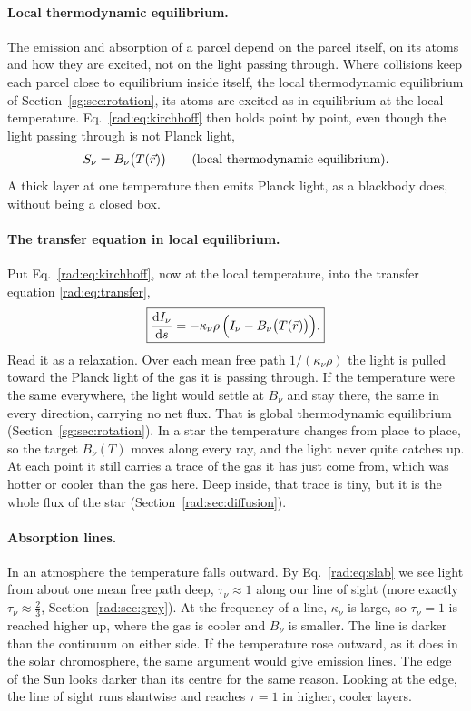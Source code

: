 \paragraph{Local thermodynamic equilibrium.} The emission and absorption of a parcel depend on the parcel itself, on its atoms and how they are excited, not on the light passing through. Where collisions keep each parcel close to equilibrium inside itself, the local thermodynamic equilibrium of Section~\ref{sg:sec:rotation}, its atoms are excited as in equilibrium at the local temperature. Eq.~\eqref{rad:eq:kirchhoff} then holds point by point, even though the light passing through is not Planck light,
\begin{equation}
	S_\nu=B_\nu\big(T(\vec r)\big)\qquad\text{(local thermodynamic equilibrium).}
	\label{rad:eq:lte_source}
\end{equation}
A thick layer at one temperature then emits Planck light, as a blackbody does, without being a closed box.

\paragraph{The transfer equation in local equilibrium.} Put Eq.~\eqref{rad:eq:kirchhoff}, now at the local temperature, into the transfer equation \eqref{rad:eq:transfer},
\begin{equation}
	\boxed{\dv{I_\nu}{s}=-\kappa_\nu\rho\,\Big(I_\nu-B_\nu\big(T(\vec r)\big)\Big).}
	\label{rad:eq:transfer_lte}
\end{equation}
Read it as a relaxation. Over each mean free path $1/(\kappa_\nu\rho)$ the light is pulled toward the Planck light of the gas it is passing through. If the temperature were the same everywhere, the light would settle at $B_\nu$ and stay there, the same in every direction, carrying no net flux. That is global thermodynamic equilibrium (Section~\ref{sg:sec:rotation}). In a star the temperature changes from place to place, so the target $B_\nu(T)$ moves along every ray, and the light never quite catches up. At each point it still carries a trace of the gas it has just come from, which was hotter or cooler than the gas here. Deep inside, that trace is tiny, but it is the whole flux of the star (Section~\ref{rad:sec:diffusion}).

\paragraph{Absorption lines.} In an atmosphere the temperature falls outward. By Eq.~\eqref{rad:eq:slab} we see light from about one mean free path deep, $\tau_\nu\approx1$ along our line of sight (more exactly $\tau_\nu\approx\tfrac23$, Section~\ref{rad:sec:grey}). At the frequency of a line, $\kappa_\nu$ is large, so $\tau_\nu=1$ is reached higher up, where the gas is cooler and $B_\nu$ is smaller. The line is darker than the continuum on either side. If the temperature rose outward, as it does in the solar chromosphere, the same argument would give emission lines. The edge of the Sun looks darker than its centre for the same reason. Looking at the edge, the line of sight runs slantwise and reaches $\tau=1$ in higher, cooler layers.

